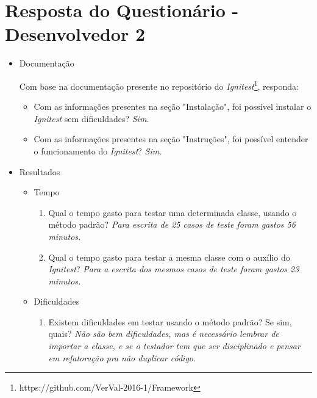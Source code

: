 \chapter{Resposta do Questionário - Desenvolvedor 2}
    
    \begin{itemize}
        \item Documentação
        
            Com base na documentação presente no repositório do \textit{Ignitest}\footnote{https://github.com/VerVal-2016-1/Framework}, responda:
            \begin{itemize}
                \item Com as informações presentes na seção "Instalação", foi possível instalar o \textit{Ignitest} sem dificuldades?
                    \subitem \textit{Sim.}

                \item Com as informações presentes na seção "Instruções", foi possível entender o funcionamento do \textit{Ignitest}?
                    \subitem \textit{Sim.}
            \end{itemize}
            
        \item Resultados
            \begin{itemize}
                \item Tempo
                    \begin{enumerate}
                        \item Qual o tempo gasto para testar uma determinada classe, usando o método padrão?
                            \subitem \textit{Para escrita de 25 casos de teste foram gastos 56 minutos.}
                        \item Qual o tempo gasto para testar a mesma classe com o auxílio do \textit{Ignitest}?
                            \subitem \textit{Para a escrita dos mesmos casos de teste foram gastos 23 minutos.}
                    \end{enumerate}
                \item Dificuldades
                    \begin{enumerate}
                        \item Existem dificuldades em testar usando o método padrão? Se sim, quais?
                            \subitem \textit{Não são bem dificuldades, mas é necessário lembrar de importar a classe, e se o testador tem que ser
                            disciplinado e pensar em refatoração pra não duplicar código.}
                        

\end{enumerate}
\end{itemize}
\end{itemize}
